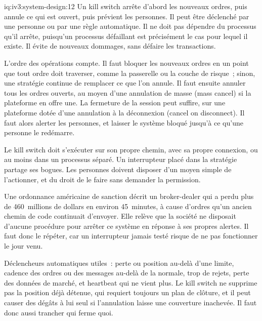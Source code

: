 \begin{solution}{iq:iv3:system-design:12}
Un kill switch arrête d'abord les nouveaux ordres, puis annule ce qui est ouvert, puis prévient les personnes. Il peut être déclenché par une personne ou par une règle automatique. Il ne doit pas dépendre du processus qu'il arrête, puisqu'un processus défaillant est précisément le cas pour lequel il existe. Il évite de nouveaux dommages, sans défaire les transactions.

L'ordre des opérations compte. Il faut bloquer les nouveaux ordres en un point que tout ordre doit traverser, comme la passerelle ou la couche de risque~; sinon, une stratégie continue de remplacer ce que l'on annule. Il faut ensuite annuler tous les ordres ouverts, au moyen d'une annulation de masse (mass cancel) si la plateforme en offre une. La fermeture de la session peut suffire, sur une plateforme dotée d'une annulation à la déconnexion (cancel on disconnect). Il faut alors alerter les personnes, et laisser le système bloqué jusqu'à ce qu'une personne le redémarre.

Le kill switch doit s'exécuter sur son propre chemin, avec sa propre connexion, ou au moins dans un processus séparé. Un interrupteur placé dans la stratégie partage ses bogues. Les personnes doivent disposer d'un moyen simple de l'actionner, et du droit de le faire sans demander la permission.

Une ordonnance américaine de sanction décrit un broker-dealer qui a perdu plus de 460~millions de dollars en environ 45~minutes, à cause d'ordres qu'un ancien chemin de code continuait d'envoyer. Elle relève que la société ne disposait d'aucune procédure pour arrêter ce système en réponse à ses propres alertes. Il faut donc le répéter, car un interrupteur jamais testé risque de ne pas fonctionner le jour venu.

Déclencheurs automatiques utiles~: perte ou position au-delà d'une limite, cadence des ordres ou des messages au-delà de la normale, trop de rejets, perte des données de marché, et heartbeat qui ne vient plus. Le kill switch ne supprime pas la position déjà détenue, qui requiert toujours un plan de clôture, et il peut causer des dégâts à lui seul si l'annulation laisse une couverture inachevée. Il faut donc aussi trancher qui ferme quoi.

\end{solution}

